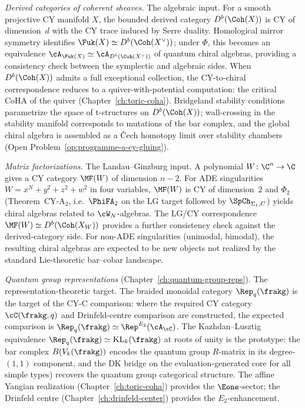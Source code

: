 \emph{Derived categories of coherent sheaves.} The algebraic
input. For a smooth projective CY manifold $X$, the bounded
derived category $D^b(\Coh(X))$ is CY of dimension~$d$ with
the CY trace induced by Serre duality. Homological mirror
symmetry identifies $\Fuk(X) \simeq D^b(\Coh(X^\vee))$; under
$\Phi$, this becomes an equivalence
$\cA_{\Fuk(X)} \simeq \cA_{D^b(\Coh(X^\vee))}$ of quantum
chiral algebras, providing a consistency check between the
symplectic and algebraic sides. When $D^b(\Coh(X))$ admits a
full exceptional collection, the CY-to-chiral correspondence reduces
to a quiver-with-potential computation: the critical CoHA of
the quiver (Chapter~\ref{ch:toric-coha}). Bridgeland stability
conditions parametrize the space of t-structures on
$D^b(\Coh(X))$; wall-crossing in the stability manifold
corresponds to mutations of the bar complex, and the global
chiral algebra is assembled as a \v Cech homotopy limit over
stability chambers (Open Problem~\ref{op:programme-a-cy-gluing}).

\emph{Matrix factorizations.} The Landau--Ginzburg input. A
polynomial $W \colon \C^n \to \C$ gives a CY category
$\MF(W)$ of dimension $n - 2$. For ADE singularities
$W = x^N + y^2 + z^2 + w^2$ in four variables, $\MF(W)$ is
CY of dimension~$2$ and $\Phi_2$ (Theorem~CY-A$_2$, i.e.\
$\PhiFA_2$ on the LG target followed by $\SpCh_{\Sigma_1,
C}$) yields chiral algebras related to $\cW_N$-algebras. The LG/CY
correspondence $\MF(W) \simeq D^b(\Coh(X_W))$ provides a
further consistency check against the derived-category side.
For non-ADE singularities (unimodal, bimodal), the resulting
chiral algebras are expected to be new objects not realized
by the standard Lie-theoretic bar--cobar landscape.

\emph{Quantum group representations}
(Chapter~\ref{ch:quantum-group-reps}). The
representation-theoretic target. The braided monoidal
category $\Rep_q(\frakg)$ is the target of the CY-C comparison:
where the required CY category $\cC(\frakg, q)$ and Drinfeld-centre
comparison are constructed, the expected comparison is
$\Rep_q(\frakg) \simeq \Rep^{E_2}(\cA_\cC)$. The Kazhdan--Lusztig equivalence
$\Rep_q(\frakg) \simeq \mathrm{KL}_k(\frakg)$ at roots of
unity is the prototype: the bar complex
$B(V_k(\frakg))$ encodes the quantum group $R$-matrix in its
degree-$(1, 1)$ component, and the DK bridge
on the evaluation-generated core for all simple types)
recovers the quantum group categorical structure.
The affine Yangian realization
(Chapter~\ref{ch:toric-coha}) provides the $\Eone$-sector;
the Drinfeld centre (Chapter~\ref{ch:drinfeld-center})
provides the $E_2$-enhancement.

